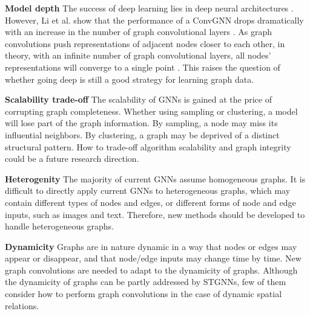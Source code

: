 	\vspace{2mm}\noindent\textbf{Model depth}
	The success of deep learning lies in deep neural architectures \cite{he2016deep}.   However, Li et al. show that the performance of a ConvGNN drops dramatically with an increase in the number of graph convolutional layers \cite{li2018deeper}. As graph convolutions push representations of adjacent nodes closer to each other, in theory, with an infinite number of graph convolutional layers, all nodes' representations will converge to a single point \cite{li2018deeper}.
	This raises the question of whether going deep is still a good strategy for learning graph data.
	
	
	\vspace{2mm}\noindent\textbf{Scalability trade-off} The scalability of GNNs is gained at the price of corrupting graph completeness.  Whether using sampling or clustering, a model will lose part of the graph information.  By sampling, a node may miss its influential neighbors. By clustering,  a graph may be deprived of a distinct structural pattern. How to trade-off algorithm scalability and graph integrity could be a future research direction.
	
	\vspace{2mm}\noindent\textbf{Heterogenity}
	The majority of current GNNs assume homogeneous graphs.  It is difficult to directly apply current GNNs to heterogeneous graphs, which may contain different types of nodes and edges, or different forms of node and edge inputs,  such as images and text. Therefore, new methods should be developed to handle heterogeneous graphs.
	
	\vspace{2mm}\noindent\textbf{Dynamicity}
	Graphs are in nature dynamic in a way that nodes or edges may appear or disappear, and that node/edge inputs may change time by time. New graph convolutions are needed to adapt to the dynamicity of graphs. Although the dynamicity of graphs can be partly addressed by STGNNs,  few of them consider how to perform graph convolutions in the case of dynamic spatial relations. 
	
